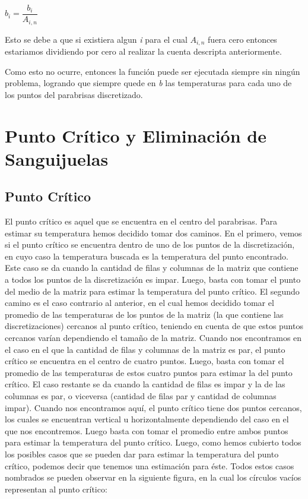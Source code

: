 \documentclass[10pt, a4paper]{article}
\begin{document}
\begin{center}
$b_{i}=\dfrac{b_{i}}{A_{i,n}}$
\end{center}

Esto se debe a que si existiera algun \textit{i} para el cual \textit{$A_{i,n}$} fuera cero entonces estariamos dividiendo por cero al realizar la cuenta descripta anteriormente.

Como esto no ocurre, entonces la funci\'on puede ser ejecutada siempre sin ning\'un problema, logrando que siempre quede en \textit{b} las temperaturas para cada uno de los puntos del parabrisas discretizado.

\newpage

\section{Punto Cr\'itico y Eliminaci\'on de Sanguijuelas}
\subsection{Punto Cr\'itico}
El punto cr\'itico es aquel que se encuentra en el centro del parabrisas. Para estimar su temperatura hemos decidido tomar dos caminos. En el primero, vemos si el punto cr\'itico se encuentra dentro de uno de los puntos de la discretizaci\'on, en cuyo caso la temperatura buscada es la temperatura del punto encontrado. Este caso se da cuando la cantidad de filas y columnas de la matriz que contiene a todos los puntos de la discretizaci\'on es impar. Luego, basta con tomar el punto del medio de la matriz para estimar la temperatura del punto cr\'itico. El segundo camino es el caso contrario al anterior, en el cual hemos decidido tomar el promedio de las temperaturas de los puntos de la matriz (la que contiene las discretizaciones) cercanos al punto cr\'itico, teniendo en cuenta de que estos puntos cercanos var\'ian dependiendo el tamaño de la matriz. Cuando nos encontramos en el caso en el que la cantidad de filas y columnas de la matriz es par, el punto cr\'itico se encuentra en el centro de cuatro puntos. Luego,  basta con tomar el promedio de las temperaturas de estos cuatro puntos para estimar la del punto cr\'itico. El caso restante se da cuando la cantidad de filas es impar y la de las columnas es par, o viceversa (cantidad de filas par y cantidad de columnas impar). Cuando nos encontramos aqu\'i, el punto cr\'itico tiene dos puntos cercanos, los cuales se encuentran vertical u horizontalmente dependiendo del caso en el que nos encontremos. Luego basta con tomar el promedio entre ambos puntos para estimar la temperatura del punto cr\'itico. Luego, como hemos cubierto todos los posibles casos que se pueden dar para estimar la temperatura del punto cr\'itico, podemos decir que tenemos una estimaci\'on para \'este. Todos estos casos nombrados se pueden observar en la siguiente figura, en la cual los c\'irculos vac\'ios representan al punto cr\'itico:
\end{document}
